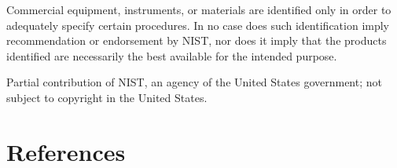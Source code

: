 \documentclass[preprint,review,12pt]{elsarticle}
\begin{document}
	Commercial equipment, instruments, or materials are identified only in order to adequately specify certain procedures. In no case does such identification imply recommendation or endorsement by NIST, nor does it imply that the products identified are necessarily the best available for the intended purpose.
	
	Partial contribution of NIST, an agency of the United States government; not subject to copyright in the United States.
	
	\section*{References}
	
	
	
		
\end{document}
